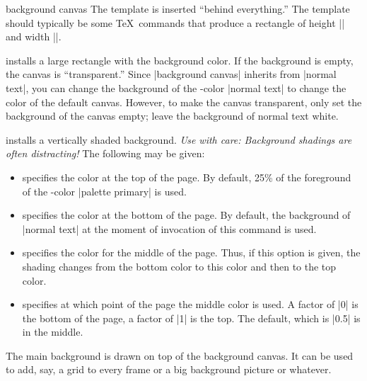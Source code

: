 \begin{element}{background canvas}\yes\yes\yes
  The template is inserted ``behind everything.'' The template should
  typically be some \TeX\ commands that produce a rectangle of height
  |\paperheight| and width |\paperwidth|.

  \begin{templateoptions}
    installs a large rectangle with the background color. If the
    background is empty, the canvas is ``transparent.'' Since
    |background canvas| inherits from |normal text|, you can change the 
    background of the \beamer-color |normal text| to change the
    color of the default canvas. However, to make the canvas
    transparent, only set the background of the canvas empty; leave
    the background of normal text white.
    
    installs a vertically shaded background. \emph{Use with care:
      Background shadings are often distracting!} The following
     may be given:
    \begin{itemize}
    \item {} specifies the color at the
      top of the page. By default, 25\% of the foreground of the
      \beamer-color |palette primary| is used.
    \item {} specifies the color at the
      bottom of the page. By default, the background of
      |normal text| at the moment of invocation of this command is
      used. 
    \item {} specifies the color
      for the middle of the page. Thus, if this option is given, the
      shading changes from the bottom color to this color and then
      to the top color.
    \item {} specifies at which
      point of the page the middle color is used. A factor of |0| is
      the bottom of the page, a factor of |1| is the top. The
      default, which is |0.5| is in the middle.
    \end{itemize}
  \end{templateoptions}  
\end{element}

The main background is drawn on top of the background canvas. It can
be used to add, say, a grid to every frame or a big background picture
or whatever.

